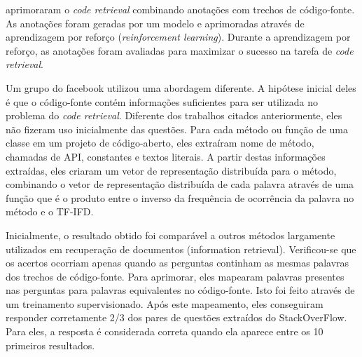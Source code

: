 \cite{Yao-coacor:2019} aprimoraram o \textit{code retrieval} combinando anotações com trechos de código-fonte. As anotações foram geradas por um modelo e aprimoradas através de aprendizagem por reforço (\textit{reinforcement learning}). Durante a aprendizagem por reforço, as anotações foram avaliadas para maximizar o sucesso na tarefa de \textit{code retrieval}.

Um grupo do facebook utilizou uma abordagem diferente. A hipótese inicial deles é que o código-fonte contém informações suficientes para ser utilizada no problema do \textit{code retrieval}. Diferente dos trabalhos citados anteriormente, eles não fizeram uso inicialmente das questões. Para cada método ou função de uma classe em um projeto de código-aberto, eles extraíram nome de método, chamadas de API, constantes e textos literais. A partir destas informações extraídas, eles criaram um vetor de representação distribuída para o método, combinando o vetor de representação distribuída de cada palavra através de uma função que é o produto entre o inverso da frequência de ocorrência da palavra no método e o TF-IFD. 

Inicialmente, o resultado obtido foi comparável a outros métodos largamente utilizados em recuperação de documentos (information retrieval). Verificou-se que os acertos ocorriam apenas quando as perguntas continham as mesmas palavras dos trechos de código-fonte. Para aprimorar, eles mapearam palavras presentes nas perguntas para palavras equivalentes no código-fonte. Isto foi feito através de um treinamento supervisionado. Após este mapeamento, eles conseguiram responder corretamente 2/3 dos pares de questões extraídos do StackOverFlow. Para eles, a resposta é considerada correta quando ela aparece entre os 10 primeiros resultados.


